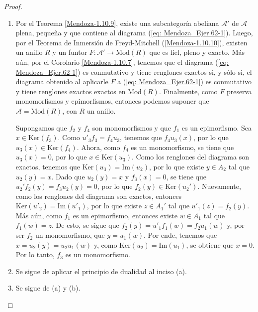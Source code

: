 \documentclass[tesis]{subfiles}
\begin{document}
\begin{proof}\leavevmode

    \begin{enumerate}[label=(\alph*)]
    
        \item Por el Teorema \ref{Mendoza-1.10.9}, existe una subcategoría abeliana $\mathscr{A}'$ de $\mathscr{A}$ plena, pequeña y que contiene al diagrama (\ref{eq: Mendoza_Ejer.62-1}). Luego, por el Teorema de Inmersión de Freyd-Mitchell (\ref{Mendoza-1.10.10}), existen un anillo $R$ y un funtor $F:\mathscr{A}'\to \text{Mod}(R)$ que es fiel, pleno y exacto. Más aún, por el Corolario \ref{Mendoza-1.10.7}, tenemos que el diagrama (\ref{eq: Mendoza_Ejer.62-1}) es conmutativo y tiene renglones exactos si, y sólo si, el diagrama obtenido al aplicarle $F$ a (\ref{eq: Mendoza_Ejer.62-1}) es conmutativo y tiene renglones exactos exactos en $\text{Mod}(R)$. Finalmente, como $F$ preserva monomorfismos y epimorfismos, entonces podemos suponer que $\mathscr{A} = \text{Mod}(R)$, con $R$ un anillo.

            Supongamos que $f_2$ y $f_4$ son monomorfismos y que $f_1$ es un epimorfismo. Sea $x\in\text{Ker}(f_3)$. Como $u'_3f_3=f_4u_3$, tenemos que $f_4u_3(x)$, por lo que $u_3(x)\in\text{Ker}(f_4)$. Ahora, como $f_4$ es un monomorfismo, se tiene que $u_3(x)=0$, por lo que $x\in\text{Ker}(u_3)$. Como los renglones del diagrama son exactos, tenemos que $\text{Ker}(u_3)=\text{Im}(u_2)$, por lo que existe $y\in A_2$ tal que $u_2(y)=x$. Dado que $u_2(y) = x$ y $f_3(x) = 0$, se tiene que $u_2'f_2(y) = f_3u_2(y) = 0$, por lo que $f_2(y)\in\text{Ker}(u_2')$. Nuevamente, como los renglones del diagrama son exactos, entonces $\text{Ker}(u'_2) = \text{Im}(u'_1)$, por lo que existe $z\in A_1'$ tal que $u'_1(z) = f_2(y)$. Más aún, como $f_1$ es un epimorfismo, entonces existe $w\in A_1$ tal que $f_1(w)=z$. De esto, se sigue que $f_2(y) = u'_1f_1(w) = f_2u_1(w)$ y, por ser $f_2$ un monomorfismo, que $y=u_1(w)$. Por ende, tenemos que $x = u_2(y) = u_2u_1(w)$ y, como $\text{Ker}(u_2) = \text{Im}(u_1)$, se obtiene que $x=0$. Por lo tanto, $f_3$ es un monomorfismo.

        \item Se sigue de aplicar el principio de dualidad al inciso (a).

        \item Se sigue de (a) y (b).
    \end{enumerate}
\end{proof}

\end{document}
